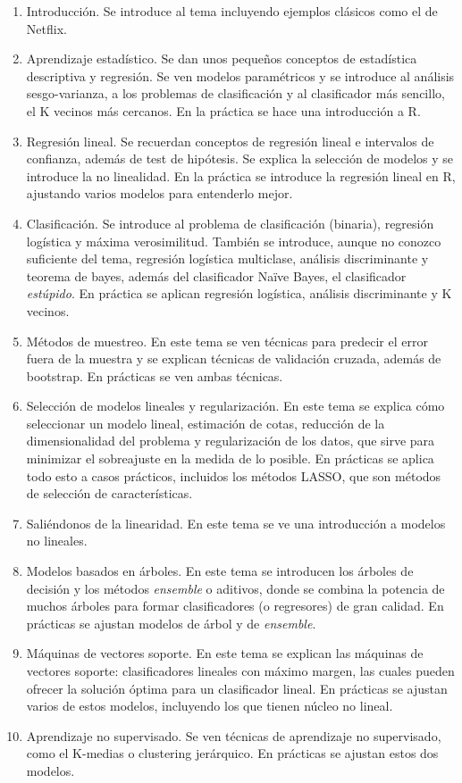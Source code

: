 \documentclass[a4paper, 11pt]{article}
\theoremstyle{definition}
\begin{document}
  \begin{enumerate}
    \item Introducción. Se introduce al tema incluyendo ejemplos clásicos como el de Netflix.
    \item Aprendizaje estadístico. Se dan unos pequeños conceptos de estadística descriptiva y regresión. Se ven modelos paramétricos y se introduce al análisis sesgo-varianza, a los problemas de clasificación y al clasificador más sencillo, el K vecinos más cercanos. En la práctica se hace una introducción a R.
    \item Regresión lineal. Se recuerdan conceptos de regresión lineal e intervalos de confianza, además de test de hipótesis. Se explica la selección de modelos y se introduce la no linealidad. En la práctica se introduce la regresión lineal en R, ajustando varios modelos para entenderlo mejor.
    \item Clasificación. Se introduce al problema de clasificación (binaria), regresión logística y máxima verosimilitud. También se introduce, aunque no conozco suficiente del tema, regresión logística multiclase, análisis discriminante y teorema de bayes, además del clasificador Naïve Bayes, el clasificador \emph{estúpido}. En práctica se aplican regresión logística, análisis discriminante y K vecinos.
    \item Métodos de muestreo. En este tema se ven técnicas para predecir el error fuera de la muestra y se explican técnicas de validación cruzada, además de bootstrap. En prácticas se ven ambas técnicas.
    \item Selección de modelos lineales y regularización. En este tema se explica cómo seleccionar un modelo lineal, estimación de cotas, reducción de la dimensionalidad del problema y regularización de los datos, que sirve para minimizar el sobreajuste en la medida de lo posible. En prácticas se aplica todo esto a casos prácticos, incluidos los métodos LASSO, que son métodos de selección de características.
    \item Saliéndonos de la linearidad. En este tema se ve una introducción a modelos no lineales.
    \item Modelos basados en árboles. En este tema se introducen los árboles de decisión y los métodos \emph{ensemble} o aditivos, donde se combina la potencia de muchos árboles para formar clasificadores (o regresores) de gran calidad. En prácticas se ajustan modelos de árbol y de \emph{ensemble}.
    \item Máquinas de vectores soporte. En este tema se explican las máquinas de vectores soporte: clasificadores lineales con máximo margen, las cuales pueden ofrecer la solución óptima para un clasificador lineal. En prácticas se ajustan varios de estos modelos, incluyendo los que tienen núcleo no lineal.
    \item Aprendizaje no supervisado. Se ven técnicas de aprendizaje no supervisado, como el K-medias o clustering jerárquico. En prácticas se ajustan estos dos modelos.
  \end{enumerate}
\end{document}
